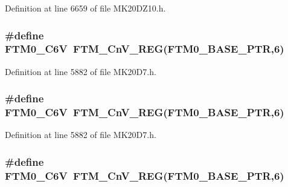 Definition at line 6659 of file M\+K20\+D\+Z10.\+h.

\subsubsection[{\texorpdfstring{F\+T\+M0\+\_\+\+C6V}{FTM0_C6V}}]{\setlength{\rightskip}{0pt plus 5cm}\#define F\+T\+M0\+\_\+\+C6V~{\bf F\+T\+M\+\_\+\+Cn\+V\+\_\+\+R\+EG}({\bf F\+T\+M0\+\_\+\+B\+A\+S\+E\+\_\+\+P\+TR},6)}\hypertarget{group___f_t_m___register___accessor___macros_gaffaf88a02a6bb91dd027f3331f77a350}{}\label{group___f_t_m___register___accessor___macros_gaffaf88a02a6bb91dd027f3331f77a350}


Definition at line 5882 of file M\+K20\+D7.\+h.

\subsubsection[{\texorpdfstring{F\+T\+M0\+\_\+\+C6V}{FTM0_C6V}}]{\setlength{\rightskip}{0pt plus 5cm}\#define F\+T\+M0\+\_\+\+C6V~{\bf F\+T\+M\+\_\+\+Cn\+V\+\_\+\+R\+EG}({\bf F\+T\+M0\+\_\+\+B\+A\+S\+E\+\_\+\+P\+TR},6)}\hypertarget{group___f_t_m___register___accessor___macros_gaffaf88a02a6bb91dd027f3331f77a350}{}\label{group___f_t_m___register___accessor___macros_gaffaf88a02a6bb91dd027f3331f77a350}


Definition at line 5882 of file M\+K20\+D7.\+h.

\subsubsection[{\texorpdfstring{F\+T\+M0\+\_\+\+C6V}{FTM0_C6V}}]{\setlength{\rightskip}{0pt plus 5cm}\#define F\+T\+M0\+\_\+\+C6V~{\bf F\+T\+M\+\_\+\+Cn\+V\+\_\+\+R\+EG}({\bf F\+T\+M0\+\_\+\+B\+A\+S\+E\+\_\+\+P\+TR},6)}\hypertarget{group___f_t_m___register___accessor___macros_gaffaf88a02a6bb91dd027f3331f77a350}{}\label{group___f_t_m___register___accessor___macros_gaffaf88a02a6bb91dd027f3331f77a350}


